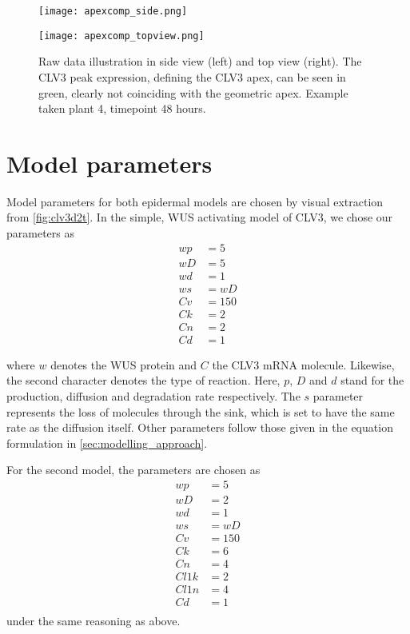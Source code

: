 \begin{figure}[H]
  \centering
  \begin{minipage}[t]{.49\textwidth}
    \centering
    \texttt{[image: apexcomp\_side.png]}
  \end{minipage}
  \begin{minipage}[t]{.49\textwidth}
    \centering
    \texttt{[image: apexcomp\_topview.png]}
  \end{minipage}
  \caption[Non-overlapping apices]{Raw data illustration in side view (left) and
    top view (right). The CLV3 peak expression, defining the CLV3 apex, can be
    seen in green, clearly not coinciding with the geometric apex. Example taken
    plant 4, timepoint 48 hours.}
  \label{fig:apex_center}
\end{figure}


\section{Model parameters}
\label{sec:modelparams}
Model parameters for both epidermal models are chosen by visual extraction from
\cref{fig:clv3d2t}. In the simple, WUS activating model of CLV3, we chose our
parameters as
\begin{align*}
  wp &= 5   \\
  wD &= 5   \\
  wd &= 1   \\
  ws &= wD  \\
  Cv &= 150 \\
  Ck &= 2   \\ 
  Cn &= 2   \\
  Cd &= 1   
\end{align*}

where $w$ denotes the WUS protein and $C$ the CLV3 mRNA molecule. Likewise, the
second character denotes the type of reaction. Here, $p$, $D$ and $d$ stand for
the production, diffusion and degradation rate respectively. The $s$ parameter
represents the loss of molecules through the sink, which is set to have the same rate
as the diffusion itself. Other parameters follow those given in the equation
formulation in \cref{sec:modelling_approach}.

For the second model, the parameters are chosen as
\begin{align*}
  wp   &= 5 \\
  wD   &= 2 \\
  wd   &= 1 \\
  ws   &= wD \\
  Cv   &= 150 \\
  Ck   &= 6 \\
  Cn   &= 4 \\
  Cl1k &= 2 \\
  Cl1n &= 4 \\
  Cd   &= 1 \\
\end{align*}
under the same reasoning as above.
